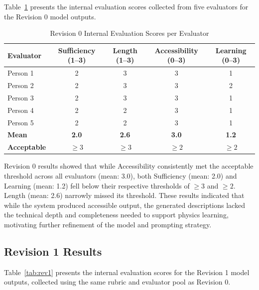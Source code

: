 \documentclass{article}
\begin{document}
Table~\ref{tab:rev0} presents the internal evaluation scores collected from five evaluators 
for the Revision 0 model outputs.

\begin{table}[t]
\centering
\caption{Revision 0 Internal Evaluation Scores per Evaluator}
\label{tab:rev0}
\begin{tabular}{lcccc}
\toprule
\textbf{Evaluator} & \textbf{Sufficiency (1--3)} & \textbf{Length (1--3)} & \textbf{Accessibility (0--3)} & \textbf{Learning (0--3)} \\
\midrule
Person 1 & 2 & 3 & 3 & 1 \\
Person 2 & 2 & 3 & 3 & 2 \\
Person 3 & 2 & 3 & 3 & 1 \\
Person 4 & 2 & 2 & 3 & 1 \\
Person 5 & 2 & 2 & 3 & 1 \\
\midrule
\textbf{Mean}       & \textbf{2.0} & \textbf{2.6} & \textbf{3.0} & \textbf{1.2} \\
\textbf{Acceptable} & $\geq 3$     & $\geq 3$     & $\geq 2$     & $\geq 2$     \\
\bottomrule
\end{tabular}
\end{table}

Revision 0 results showed that while Accessibility consistently met the acceptable 
threshold across all evaluators (mean: 3.0), both Sufficiency (mean: 2.0) and Learning 
(mean: 1.2) fell below their respective thresholds of $\geq 3$ and $\geq 2$. Length 
(mean: 2.6) narrowly missed its threshold. These results indicated that while the 
system produced accessible output, the generated descriptions lacked the technical 
depth and completeness needed to support physics learning, motivating further refinement 
of the model and prompting strategy.

\subsection{Revision 1 Results}

Table~\ref{tab:rev1} presents the internal evaluation scores for the Revision 1 model 
outputs, collected using the same rubric and evaluator pool as Revision 0.
\end{document}
